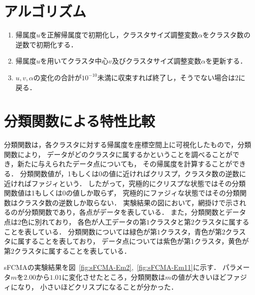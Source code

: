 \documentclass[a4j,12pt,dvipdfmx,oneside]{jsbook}
\theoremstyle{definition}
\begin{document}
 \section{アルゴリズム}\label{sec:artificial_data_algorythm}
  \begin{enumerate}
   \item 帰属度$u$を正解帰属度で初期化し，クラスタサイズ調整変数$\alpha$をクラスタ数の逆数で初期化する．
   \item 帰属度$u$を用いてクラスタ中心$v$及びクラスタサイズ調整変数$\alpha$を更新する．
   \item $u, v, \alpha$の変化の合計が$10^{-10}$未満に収束すれば終了し，そうでない場合は$2$に戻る．
  \end{enumerate}

  \section{分類関数による特性比較}\label{sec:classification_function}

  分類関数は，各クラスタに対する帰属度を座標空間上に可視化したもので，分類関数により，
  データがどのクラスタに属するかということを調べることができ，新たに与えられたデータ点についても，
  その帰属度を計算することができる．
  分類関数値が，1もしくは0の値に近ければクリスプ，クラスタ数の逆数に近ければファジィという．
  したがって，究極的にクリスプな状態ではその分類関数値は1もしくは0の値しか取らず，
  究極的にファジィな状態ではその分類関数はクラスタ数の逆数しか取らない．
  実験結果の図において，網掛けで示されるのが分類関数であり，各点がデータを表している．
  また，分類関数とデータ点は$2$色に別れており，
  各色が人工データの第$1$クラスタと第$2$クラスタに属することを表している．
  分類関数については緑色が第$1$クラスタ，青色が第$2$クラスタに属することを表しており，
  データ点については紫色が第$1$クラスタ，黄色が第$2$クラスタに属することを表している．
  
  sFCMAの実験結果を図~\ref{fig:sFCMA-Em2},~\ref{fig:sFCMA-Em11}に示す．
  パラメータ$m$を$2.00$から$1.01$に変化させたところ，分類関数は$m$の値が大きいほどファジィになり，
  小さいほどクリスプになることが分かった．
\end{document}
